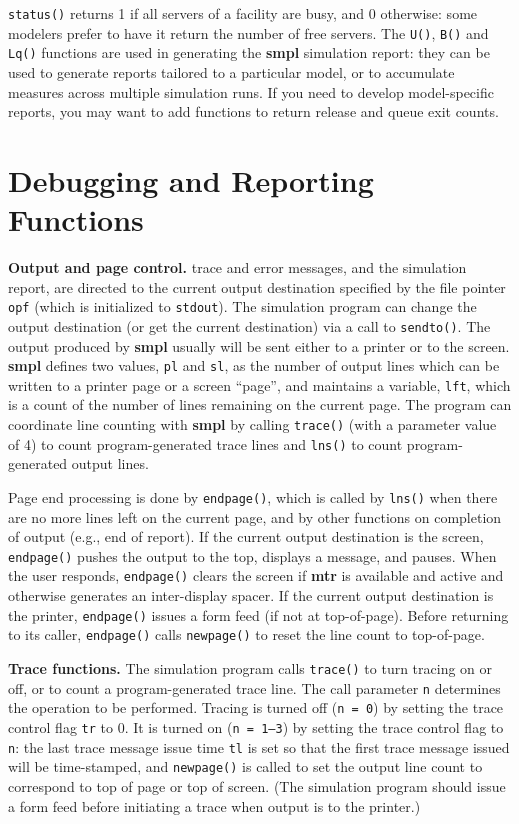 \texttt{status()} returns 1 if all servers of a facility are busy, and 0 otherwise:
some modelers prefer to have it return the number of free servers. The \texttt{U()},
\texttt{B()} and \texttt{Lq()} functions are used in generating the \textbf{smpl} simulation report:
they can be used to generate reports tailored to a particular model, or to
accumulate measures across multiple simulation runs. If you need to develop
model-specific reports, you may want to add functions to return release and
queue exit counts.

\section{Debugging and Reporting Functions}

\textbf{Output and page control.} trace and error messages, and the simulation
report, are directed to the current output destination specified by the file
pointer \texttt{opf} (which is initialized to \texttt{stdout}). The simulation program can
change the output destination (or get the current destination) via a call to
\texttt{sendto()}. The output produced by \textbf{smpl} usually will be sent either to a
printer or to the screen. \textbf{smpl} defines two values, \texttt{pl} and \texttt{sl}, as the number of
output lines which can be written to a printer page or a screen ``page'', and
maintains a variable, \texttt{lft}, which is a count of the number of lines remaining
on the current page. The program can coordinate line counting with \textbf{smpl} by
calling \texttt{trace()} (with a parameter value of 4) to count program-generated
trace lines and \texttt{lns()} to count program-generated output lines.

Page end processing is done by \texttt{endpage()}, which is called by \texttt{lns()}
when there are no more lines left on the current page, and by other functions
on completion of output (e.g., end of report). If the current output destination
is the screen, \texttt{endpage()} pushes the output to the top, displays a message,
and pauses. When the user responds, \texttt{endpage()} clears the screen if \textbf{mtr} is
available and active and otherwise generates an inter-display spacer. If
the current output destination is the printer, \texttt{endpage()} issues a form feed
(if not at top-of-page). Before returning to its caller, \texttt{endpage()} calls
\texttt{newpage()} to reset the line count to top-of-page.

\textbf{Trace functions.} The simulation program calls \texttt{trace()} to turn tracing on
or off, or to count a program-generated trace line. The call parameter \texttt{n}
determines the operation to be performed. Tracing is turned off (\texttt{n = 0}) by
setting the trace control flag \texttt{tr} to 0. It is turned on (\texttt{n = 1--3}) by setting the
trace control flag to \texttt{n}: the last trace message issue time \texttt{tl} is set so that the
first trace message issued will be time-stamped, and \texttt{newpage()} is called to
set the output line count to correspond to top of page or top of screen. (The
simulation program should issue a form feed before initiating a trace when
output is to the printer.)

